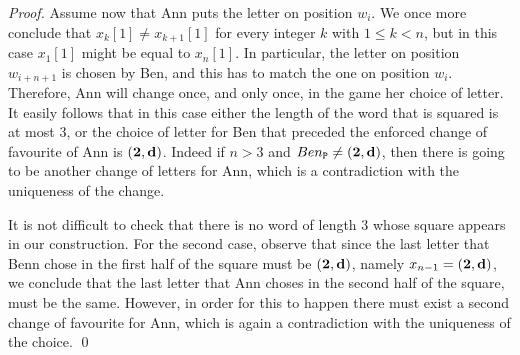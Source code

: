 \documentclass[runningheads,fleqn]{llncs}
\begin{document}
\begin{proof}
Assume now that Ann puts the letter on position $w_i$. We once more conclude that $x_k[1] \neq x_{k+1}[1]$ for every integer $k$ with $1\leq k < n$, but in this case $x_1[1]$ might be equal to $x_n[1]$. In particular, the letter on position $w_{i+n+1}$ is chosen by Ben, and this has to match the one on position $w_i$. Therefore, Ann will change once, and only once, in the game her choice of letter. It easily follows that in this case either the length of the word that is squared is at most 3, or the choice of letter for Ben that preceded the enforced change of favourite of Ann is $(\textbf 2,\textbf d)$. Indeed if $n>3$ and $Ben_{\tt P}\neq (\textbf 2,\textbf d)$, then there is going to be another change of letters for Ann, which is a contradiction with the uniqueness of the change.

It is not difficult to check that there is no word of length $3$ whose square appears in our construction. For the second case, observe that since the last letter that Benn chose in the first half of the square must be $(\textbf 2,\textbf d)$, namely $x_{n-1}=(\textbf 2,\textbf d)$, we conclude that the last letter that Ann choses in the second half of the square, must be the same. However, in order for this to happen there must exist a second change of favourite for Ann, which is again a contradiction with the uniqueness of the choice.
\qed\end{proof}



\end{document}
